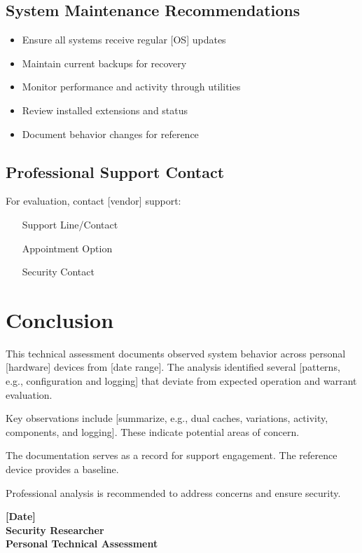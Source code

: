 \documentclass[11pt, a4paper]{article}
\begin{document}
\subsection{System Maintenance Recommendations}
\begin{itemize}
    \item Ensure all systems receive regular [OS] updates
    \item Maintain current backups for recovery
    \item Monitor performance and activity through utilities
    \item Review installed extensions and status
    \item Document behavior changes for reference
\end{itemize}

\subsection{Professional Support Contact}
For evaluation, contact [vendor] support:
\begin{itemize}
    \item [Support Line/Contact]
    \item [Appointment Option]
    \item [Security Contact]
\end{itemize}

\section{Conclusion}

This technical assessment documents observed system behavior across personal [hardware] devices from [date range]. The analysis identified several [patterns, e.g., configuration and logging] that deviate from expected operation and warrant evaluation.

Key observations include [summarize, e.g., dual caches, variations, activity, components, and logging]. These indicate potential areas of concern.

The documentation serves as a record for support engagement. The reference device provides a baseline.

Professional analysis is recommended to address concerns and ensure security.

\vspace{1cm}
\begin{center}
    \textbf{[Date]}\\
    \textbf{Security Researcher}\\
    \textbf{Personal Technical Assessment}
\end{center}
\end{document}
